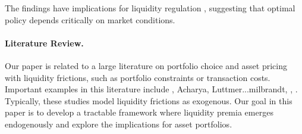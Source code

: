 The findings have  implications for liquidity regulation , suggesting that optimal policy depends critically on  market conditions.


\paragraph{Literature Review. }

Our paper is related to a large literature on portfolio choice and
asset pricing with liquidity frictions, such as portfolio constraints
or transaction costs. Important examples in this literature include
\citet{Constantinides1986,Basak1998,Vayanos1999,He2013} \citet{constanidesduffie1996,KruegerLustig2010},
Acharya, Luttmer...milbrandt, \citet{Holmstrom2001}, \citep[see][]{lagos2010asset}.
Typically, these studies model liquidity frictions as exogenous. Our
goal in this paper is to develop a tractable framework where liquidity
premia emerges endogenously and explore the implications for asset
portfolios.

